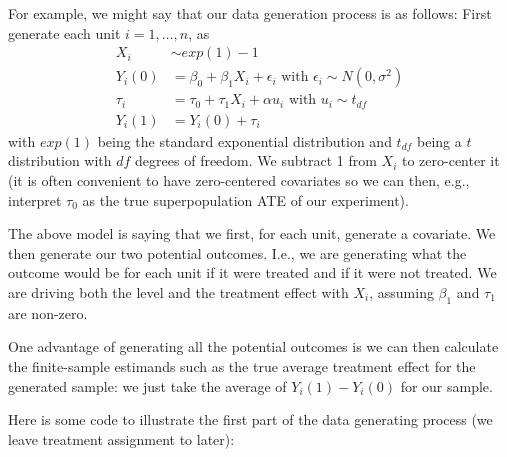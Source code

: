 \documentclass[
]{book}
\begin{document}
For example, we might say that our data generation process is as follows: First generate each unit \(i = 1, \ldots, n\), as
\[
\begin{aligned}
X_i &\sim exp( 1 ) - 1 \\
Y_i(0) &= \beta_0 + \beta_1 X_i + \epsilon_i \mbox{ with } \epsilon_i \sim N( 0, \sigma^2 ) \\
\tau_i &= \tau_0 + \tau_1 X_i + \alpha u_i \mbox{ with } u_i \sim t_{df} \\
Y_i(1) &= Y_i(0) + \tau_i 
\end{aligned}
\]
with \(exp(1)\) being the standard exponential distribution and \(t_{df}\) being a \(t\) distribution with \(df\) degrees of freedom.
We subtract 1 from \(X_i\) to zero-center it (it is often convenient to have zero-centered covariates so we can then, e.g., interpret \(\tau_0\) as the true superpopulation ATE of our experiment).

The above model is saying that we first, for each unit, generate a covariate.
We then generate our two potential outcomes.
I.e., we are generating what the outcome would be for each unit if it were treated and if it were not treated.
We are driving both the level and the treatment effect with \(X_i\), assuming \(\beta_1\) and \(\tau_1\) are non-zero.

One advantage of generating all the potential outcomes is we can then calculate the finite-sample estimands such as the true average treatment effect for the generated sample: we just take the average of \(Y_i(1) - Y_i(0)\) for our sample.

Here is some code to illustrate the first part of the data generating process (we leave treatment assignment to later):
\end{document}
